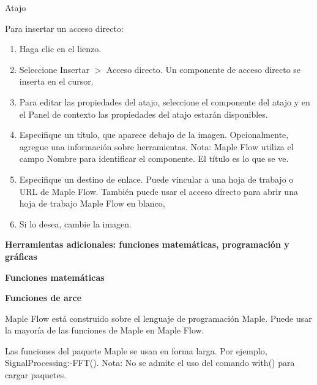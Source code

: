 
Atajo

Para insertar un acceso directo:

\begin{enumerate}
	\item Haga clic en el lienzo.
	
	\item Seleccione Insertar $>$ Acceso directo. Un componente de acceso directo se inserta en el cursor.
	
	\item Para editar las propiedades del atajo, seleccione el componente del atajo y en el Panel de contexto las propiedades del atajo estarán disponibles.
	
\end{enumerate}




\begin{enumerate}
	\setcounter{enumi}{3}
	
	\item Especifique un título, que aparece debajo de la imagen. Opcionalmente, agregue una información sobre herramientas. Nota: Maple Flow utiliza el campo Nombre para identificar el componente. El título es lo que se ve.
	
	\item Especifique un destino de enlace. Puede vincular a una hoja de trabajo o URL de Maple Flow. También puede usar el acceso directo para abrir una hoja de trabajo Maple Flow en blanco,
	
	\item Si lo desea, cambie la imagen.
	
\end{enumerate}

\textbf{Herramientas adicionales: funciones matemáticas, programación y gráficas}

\textbf{Funciones matemáticas}

\textbf{Funciones de arce}

Maple Flow está construido sobre el lenguaje de programación Maple. Puede usar la mayoría de las funciones de Maple en Maple Flow.

Las funciones del paquete Maple se usan en forma larga. Por ejemplo, SignalProcessing:-FFT(). Nota: No se admite el uso del comando with() para cargar paquetes.

